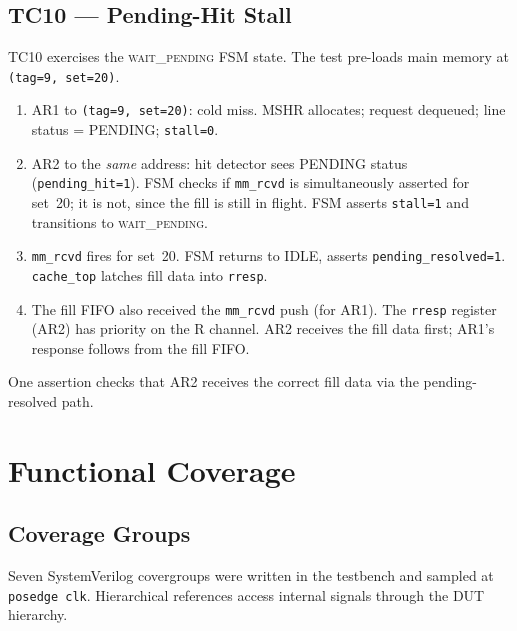 \documentclass[12pt,letterpaper]{report}
\begin{document}
\subsection{TC10 — Pending-Hit Stall}
\label{sec:tc10}

TC10 exercises the \textsc{wait\_pending} FSM state.  The test
pre-loads main memory at \texttt{(tag=9, set=20)}.

\begin{enumerate}[label=\arabic*.]
  \item AR1 to \texttt{(tag=9, set=20)}: cold miss.  MSHR allocates;
        request dequeued; line status = PENDING; \texttt{stall=0}.
  \item AR2 to the \emph{same} address: hit detector sees PENDING
        status (\texttt{pending\_hit=1}).  FSM checks if
        \texttt{mm\_rcvd} is simultaneously asserted for set~20; it
        is not, since the fill is still in flight.  FSM asserts
        \texttt{stall=1} and transitions to \textsc{wait\_pending}.
  \item \texttt{mm\_rcvd} fires for set~20.  FSM returns to IDLE,
        asserts \texttt{pending\_resolved=1}.  \texttt{cache\_top}
        latches fill data into \texttt{rresp}.
  \item The fill FIFO also received the \texttt{mm\_rcvd} push (for
        AR1).  The \texttt{rresp} register (AR2) has priority on the
        R channel.  AR2 receives the fill data first; AR1's response
        follows from the fill FIFO.
\end{enumerate}

One assertion checks that AR2 receives the correct fill data via the
pending-resolved path.

\section{Functional Coverage}
\label{sec:coverage}

\subsection{Coverage Groups}

Seven SystemVerilog covergroups were written in the testbench and
sampled at \texttt{posedge clk}.  Hierarchical references access
internal signals through the DUT hierarchy.
\end{document}
